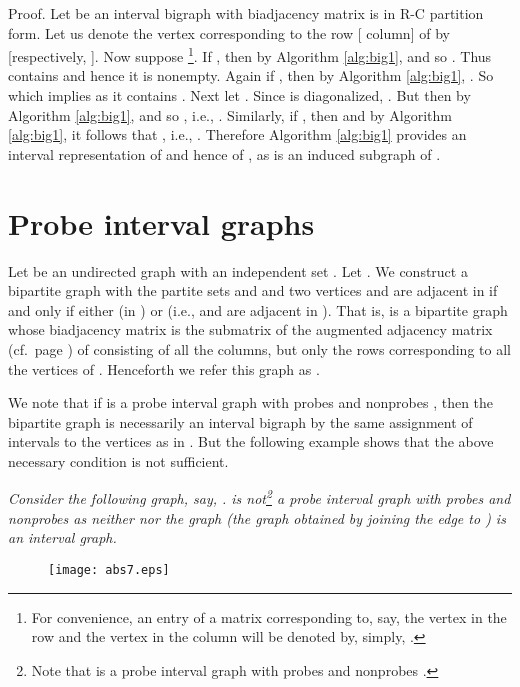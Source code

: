 \documentclass[secthm]{elsart}
\begin{document}
\vspace{-1.5em}\begin{pf*}{Proof.}
Let  be an interval bigraph with biadjacency matrix  is in R-C partition form. Let us denote the vertex corresponding to the  row [ column] of  by  [respectively, ]. Now suppose \footnote{For convenience, an entry of a matrix corresponding to, say, the vertex  in the row and the vertex  in the column will be denoted by, simply, .}. If , then by Algorithm \ref{alg:big1},  and so . Thus  contains  and hence it is nonempty. Again if , then by Algorithm \ref{alg:big1}, . So  which implies  as it contains . Next let . Since  is diagonalized, . But then by Algorithm \ref{alg:big1},  and so , i.e., . Similarly, if , then  and by Algorithm \ref{alg:big1}, it follows that , i.e., . Therefore Algorithm \ref{alg:big1} provides an interval representation of  and hence of , as  is an induced subgraph of . \hfill 
\end{pf*}

\section{Probe interval graphs}

Let  be an undirected graph with an independent set . Let . We construct a bipartite graph  with the partite sets  and  and two vertices  and  are adjacent in  if and only if either  (in ) or  (i.e.,  and  are adjacent in ). That is,  is a bipartite graph whose biadjacency matrix is the submatrix  of the augmented adjacency matrix (cf.~page \pageref{'augmented'}) of  consisting of all the columns, but only the rows corresponding to all the vertices of . Henceforth we refer this graph as .

We note that if  is a probe interval graph with probes  and nonprobes , then the bipartite graph  is necessarily an interval bigraph by the same assignment of intervals to the vertices as in . But the following example shows that the above necessary condition is not sufficient.

\begin{exmp}\label{exmp:at}
{\em Consider the following graph, say, .  is not\footnote{Note that  is a probe interval graph with probes  and nonprobes .} a probe interval graph with probes  and nonprobes  as neither  nor the graph  (the graph obtained by joining the edge  to ) is an interval graph.} 

\vspace{1em}
\begin{figure}[h]
\begin{center}
\texttt{[image: abs7.eps]}
\end{center}
\end{figure}

\vspace{1em}{\em But the biadjacency matrix of the bipartite graph  has an R-C partition showing that  is an interval bigraph.}

\end{exmp}
\end{document}
